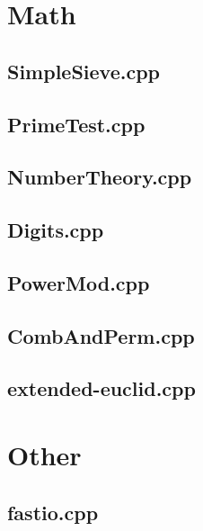 \documentclass[10pt,twocolumn,landscape]{article}
\begin{document}
\section{Math}

\subsection{SimpleSieve.cpp}


\subsection{PrimeTest.cpp}


\subsection{NumberTheory.cpp}


\subsection{Digits.cpp}


\subsection{PowerMod.cpp}


\subsection{CombAndPerm.cpp}


\subsection{extended-euclid.cpp}


\section{Other}

\subsection{fastio.cpp}

\end{document}
